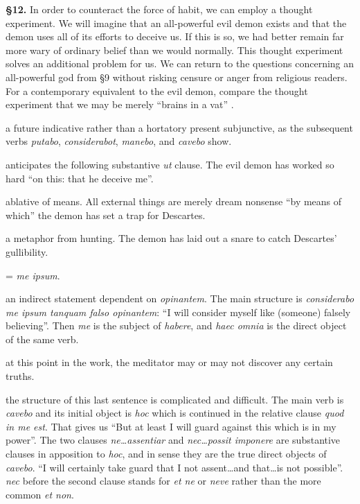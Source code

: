 \prenotes

\textbf{§12.} In order to counteract the force of habit, we can employ a thought experiment. We will imagine that an all-powerful evil demon exists and that the demon uses all of its efforts to deceive us. If this is so, we had better remain far more wary of ordinary belief than we would normally. This thought experiment solves an additional problem for us. We can return to the questions concerning an all-powerful god from §9 without risking censure or anger from religious readers. For a contemporary equivalent to the evil demon, compare the thought experiment that we may be merely ``brains in a vat'' \cite[5]{harman1973}.

 a future indicative rather than a hortatory present subjunctive, as the subsequent verbs \textit{putabo}, \textit{considerabot}, \textit{manebo}, and \textit{cavebo} show.

 anticipates the following substantive \textit{ut} clause. The evil demon has worked so hard ``on this: that he deceive me''.

 ablative of means. All external things are merely dream nonsense ``by means of which'' the demon has set a trap for Descartes.

 a metaphor from hunting. The demon has laid out a snare to catch Descartes' gullibility.

 = \textit{me ipsum}.

 an indirect statement dependent on \textit{opinantem}. The main structure is \textit{considerabo me ipsum tanquam falso opinantem}: ``I will consider myself like (someone) falsely believing''. Then \textit{me} is the subject of \textit{habere}, and \textit{haec omnia} is the direct object of the same verb.

 at this point in the work, the meditator may or may not discover any certain truths.

 the structure of this last sentence is complicated and difficult. The main verb is \textit{cavebo} and its initial object is \textit{hoc} which is continued in the relative clause \textit{quod in me est}. That gives us ``But at least I will guard against this which is in my power''. The two clauses \textit{ne\dots assentiar} and \textit{nec\dots possit imponere} are substantive clauses in apposition to \textit{hoc}, and in sense they are the true direct objects of \textit{cavebo}. ``I will certainly take guard that I not assent\dots and that\dots is not possible''. \textit{nec} before the second clause stands for \textit{et ne} or \textit{neve} rather than the more common \textit{et non}.


